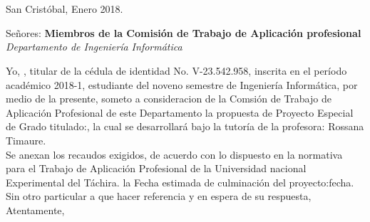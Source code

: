 \chapter*{}
\pagestyle{empty}
\thispagestyle{empty}
\begin{flushright}
San Crist\'obal, Enero 2018.
\end{flushright}


\begin{flushleft}
Se\~nores:
\textbf{Miembros de la Comisi\'on de Trabajo de Aplicaci\'on profesional}
\textit{Departamento de Ingenier\'ia Inform\'atica}
\end{flushleft}



	Yo, , titular de la c\'edula de identidad No. V-23.542.958, inscrita en el per\'iodo acad\'emico 2018-1, estudiante del noveno semestre de Ingenier\'ia Inform\'atica, por medio de la presente, someto a consideracion de la Comsi\'on de Trabajo de Aplicaci\'on Profesional de este Departamento la propuesta de Proyecto Especial de Grado titulado:\textbf{}, la cual se desarrollar\'a bajo la tutor\'ia de la profesora: Rossana Timaure.\\
	
	
	Se anexan los recaudos exigidos, de acuerdo con lo dispuesto en la normativa para el Trabajo de Aplicaci\'on Profesional de la Universidad nacional Experimental del T\'achira. la Fecha estimada de culminaci\'on del proyecto:fecha.\\
	
	
	Sin otro particular a que hacer referencia y en espera de su respuesta,\\
	
	
	Atentamente,\\
	
	
	\begin{center}
	
	
	
	\end{center}
	 